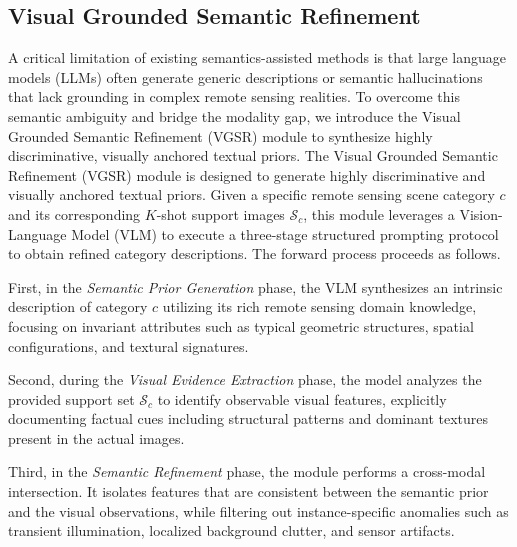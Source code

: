\documentclass[lettersize,journal]{IEEEtran}
\begin{document}
\subsection{Visual Grounded Semantic Refinement}
\label{sec:vgsr}
A critical limitation of existing semantics-assisted methods is that large language models (LLMs) often generate generic descriptions or semantic hallucinations that lack grounding in complex remote sensing realities. 
To overcome this semantic ambiguity and bridge the modality gap, we introduce the Visual Grounded Semantic Refinement (VGSR) module to synthesize highly discriminative, visually anchored textual priors.
The Visual Grounded Semantic Refinement (VGSR) module is designed to generate highly discriminative and visually anchored textual priors. 
Given a specific remote sensing scene category $c$ and its corresponding $K$-shot support images $\mathcal{S}_c$, this module leverages a Vision-Language Model (VLM) to execute a three-stage structured prompting protocol to obtain refined category descriptions. 
The forward process proceeds as follows. 

First, in the \textit{Semantic Prior Generation} phase, the VLM synthesizes an intrinsic description of category $c$ utilizing its rich remote sensing domain knowledge, focusing on invariant attributes such as typical geometric structures, spatial configurations, and textural signatures. 

Second, during the \textit{Visual Evidence Extraction} phase, the model analyzes the provided support set $\mathcal{S}_c$ to identify observable visual features, explicitly documenting factual cues including structural patterns and dominant textures present in the actual images. 

Third, in the \textit{Semantic Refinement} phase, the module performs a cross-modal intersection. 
It isolates features that are consistent between the semantic prior and the visual observations, while filtering out instance-specific anomalies such as transient illumination, localized background clutter, and sensor artifacts. 
\end{document}
